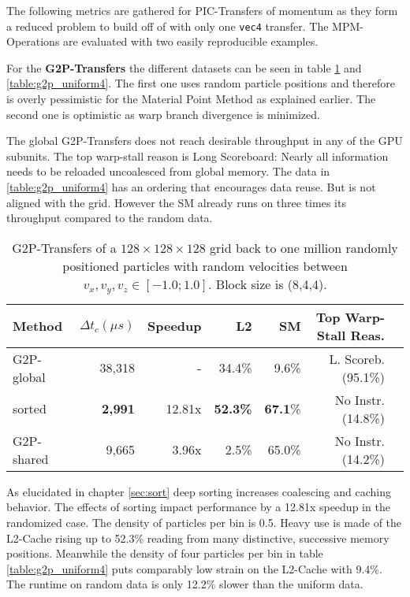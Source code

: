 \documentclass[m,times]{cgMA}
\begin{document}
The following metrics are gathered for PIC-Transfers of momentum as they form a reduced problem to build off of with only one \texttt{vec4} transfer. The MPM-Operations are evaluated with two easily reproducible examples.

For the \textbf{G2P-Transfers} the different datasets can be seen in table \ref{table:g2p_random} and \ref{table:g2p_uniform4}. The first one uses random particle positions and therefore is overly pessimistic for the Material Point Method as explained earlier. The second one is optimistic as warp branch divergence is minimized.

The global G2P-Transfers does not reach desirable throughput in any of the GPU subunits. The top warp-stall reason is Long Scoreboard: Nearly all information needs to be reloaded uncoalesced from global memory. The data in \ref{table:g2p_uniform4} has an ordering that encourages data reuse. But is not aligned with the grid. However the SM already runs on three times its throughput compared to the random data.

\begin{table}[htpb]
  \begin{tabular}{ | l | r | r | r | r | r |r|}    \hline
    Method                 &  $\Delta t_c(\mu s)$ &Speedup         & L2    &SM     &Top Warp-Stall Reas. \\\hline
    G2P-global             &   38,318             &-               &34.4\% & 9.6\% &L. Scoreb.(95.1\%)  \\\hline
    sorted                 &    \textbf{2,991}    &12.81x          &\textbf{52.3\%}&\textbf{67.1}\% &No Instr.(14.8\%)   \\\hline
    G2P-shared             &    9,665             & 3.96x          & 2.5\% &65.0\% &No Instr.(14.2\%)\\\hline
 \end{tabular}
 \caption{G2P-Transfers of a $128\times 128\times128$ grid back to one million randomly positioned particles with random velocities between $v_x,v_y,v_z \in [-1.0;1.0]$. Block size is (8,4,4).}\label{table:g2p_random}
\end{table}

As elucidated in chapter \ref{sec:sort} deep sorting increases coalescing and caching behavior. The effects of sorting impact performance by a 12.81x speedup in the randomized case. The density of particles per bin is 0.5. Heavy use is made of the L2-Cache rising up to 52.3\% reading from many distinctive, successive memory positions. Meanwhile the density of four particles per bin in table \ref{table:g2p_uniform4} puts comparably low strain on the L2-Cache with 9.4\%. The runtime on random data is only 12.2\% slower than the uniform data.
\end{document}

